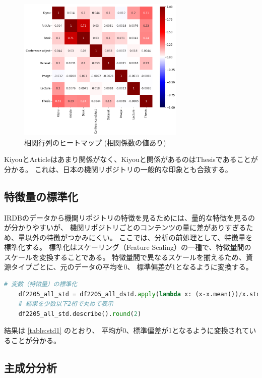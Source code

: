 \documentclass[submit,noauthor]{ono}
\begin{document}
\begin{figure}[h]
	\includegraphics[width=8cm]{./picture/heatmap.png}
	\caption{相関行列のヒートマップ (相関係数の値あり)}
	\label{fig:heatmap12}
\end{figure}

KiyouとArticleはあまり関係がなく、Kiyouと関係があるのはThesisであることが分かる。
これは、日本の機関リポジトリの一般的な印象とも合致する。

\subsection{特徴量の標準化}

IRDBのデータから機関リポジトリの特徴を見るためには、量的な特徴を見るのが分かりやすいが、
機関リポジトリごとのコンテンツの量に差がありすぎるため、量以外の特徴がつかみにくい。
ここでは、分析の前処理として、特徴量を標準化する。
標準化はスケーリング（Feature Scaling）の一種で、特徴量間のスケールを変換することである。
特徴量間で異なるスケールを揃えるため、資源タイプごとに、元のデータの平均を0、
標準偏差が1となるように変換する。

\begin{lstlisting}[language=Python,breaklines]
	# 変数（特徴量）の標準化
	df2205_all_std = df2205_all_dstd.apply(lambda x: (x-x.mean())/x.std(), axis=0)
	# 結果を少数以下2桁で丸めて表示
	df2205_all_std.describe().round(2)
\end{lstlisting}

結果は \ref{table:std1} のとおり、
平均が0、標準偏差が1となるように変換されていることが分かる。

\subsection{主成分分析}
\end{document}
